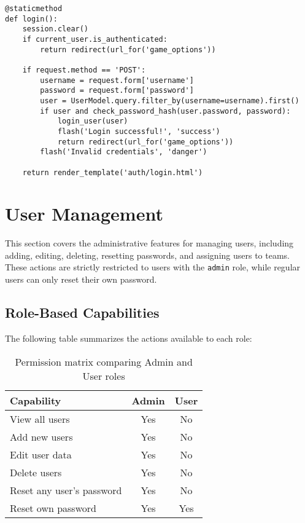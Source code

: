 \documentclass[12pt]{article}
\begin{document}
\begin{verbatim}
@staticmethod
def login():
    session.clear()
    if current_user.is_authenticated:
        return redirect(url_for('game_options'))

    if request.method == 'POST':
        username = request.form['username']
        password = request.form['password']
        user = UserModel.query.filter_by(username=username).first()
        if user and check_password_hash(user.password, password):
            login_user(user)
            flash('Login successful!', 'success')
            return redirect(url_for('game_options'))
        flash('Invalid credentials', 'danger')

    return render_template('auth/login.html')
\end{verbatim}

\section{User Management}

This section covers the administrative features for managing users, including adding, editing, deleting, resetting passwords, and assigning users to teams. These actions are strictly restricted to users with the \texttt{admin} role, while regular users can only reset their own password.

\subsection*{Role-Based Capabilities}

The following table summarizes the actions available to each role:

\begin{table}[h!]
\centering
\renewcommand{\arraystretch}{1.2}
\begin{tabularx}{\textwidth}{|X|c|c|}
\hline
\textbf{Capability} & \textbf{Admin} & \textbf{User} \\
\hline
View all users            & Yes & No \\
Add new users             & Yes & No \\
Edit user data            & Yes & No \\
Delete users              & Yes & No \\
Reset any user's password & Yes & No \\
Reset own password        & Yes & Yes \\
\hline
\end{tabularx}
\caption{Permission matrix comparing Admin and User roles}
\end{table}
\end{document}
